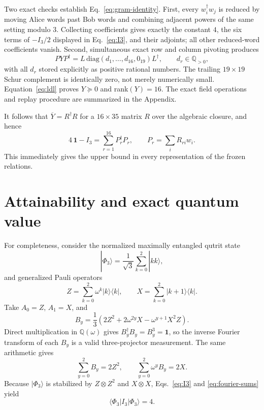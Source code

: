 \documentclass[aps,pra,reprint,superscriptaddress,nofootinbib,longbibliography]{revtex4-2}
\newcommand{\id}{\mathbf{1}}
\newcommand{\Q}{\mathbb{Q}}
\begin{document}
Two exact checks establish Eq.~\eqref{eq:gram-identity}.  First, every
$w_i^\dagger w_j$ is reduced by moving Alice words past Bob words and combining
adjacent powers of the same setting modulo $3$.  Collecting coefficients gives
exactly the constant $4$, the six terms of $-I_3/2$ displayed in
Eq.~\eqref{eq:I3}, and their adjoints; all other reduced-word coefficients
vanish.  Second, simultaneous exact row and column pivoting produces
\begin{equation}
 PYP^\dagger=L\,\mathrm{diag}(d_1,\ldots,d_{16},0_{19})L^\dagger,
 \qquad d_r\in\Q_{>0},
 \label{eq:ldl}
\end{equation}
with all $d_r$ stored explicitly as positive rational numbers.  The trailing
$19\times19$ Schur complement is identically zero, not merely numerically
small.  Equation~\eqref{eq:ldl} proves $Y\succeq0$ and rank$(Y)=16$.
The exact field operations and replay procedure are summarized in the
Appendix.

It follows that $\overline{Y}=R^\dagger R$ for a $16\times35$ matrix $R$ over
the algebraic closure, and hence
\begin{equation}
 4\,\id-I_3=\sum_{r=1}^{16}P_r^\dagger P_r,
 \qquad P_r=\sum_i R_{ri}w_i .
 \label{eq:sos}
\end{equation}
This immediately gives the upper bound in every representation of the frozen
relations.

\section{Attainability and exact quantum value}

For completeness, consider the normalized maximally entangled qutrit state
\begin{equation}
 |\Phi_3\rangle=\frac1{\sqrt3}\sum_{k=0}^2|kk\rangle,
 \label{eq:phi}
\end{equation}
and generalized Pauli operators
\begin{equation}
 Z=\sum_{k=0}^2\omega^k|k\rangle\langle k|,
 \qquad X=\sum_{k=0}^2|k+1\rangle\langle k|.
\end{equation}
Take $A_0=Z$, $A_1=X$, and~\cite{Perito2026}
\begin{equation}
 B_y=\frac13\left(2Z^2+2\omega^{2y}X-\omega^{y+1}X^2Z\right).
 \label{eq:By}
\end{equation}
Direct multiplication in $\Q(\omega)$ gives
$B_y^\dagger B_y=B_y^3=\id$, so the inverse Fourier transform of each $B_y$
is a valid three-projector measurement.  The same arithmetic gives
\begin{equation}
 \sum_{y=0}^2B_y=2Z^2,\qquad
 \sum_{y=0}^2\omega^yB_y=2X.
 \label{eq:fourier-sums}
\end{equation}
Because $|\Phi_3\rangle$ is stabilized by $Z\otimes Z^2$ and $X\otimes X$,
Eqs.~\eqref{eq:I3} and \eqref{eq:fourier-sums} yield
\begin{equation}
 \langle\Phi_3|I_3|\Phi_3\rangle=4.
 \label{eq:lower}
\end{equation}
\end{document}
